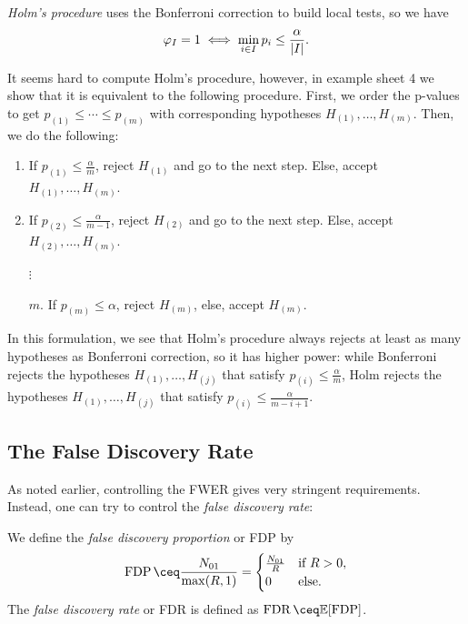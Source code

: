 \begin{example}
	\emph{Holm's procedure} uses the Bonferroni correction to build local tests, so we have
	\[
	\varphi_I = 1 \iff \min_{i \in I} p_i \leq \frac\alpha{\abs{I}}. 
	\]
\end{example}
It seems hard to compute Holm's procedure, however, in example sheet 4 we show that it is equivalent to the following procedure. First, we order the p-values to get $p_{(1)} \leq \dotsb \leq p_{(m)}$ with corresponding hypotheses $H_{(1)}, \dotsc, H_{(m)}$. Then, we do the following:
\begin{enumerate}
	\item If $p_{(1)} \leq \frac\alpha m$, reject $H_{(1)}$ and go to the next step. Else, accept $H_{(1)}, \dotsc, H_{(m)}$. 
	\item If $p_{(2)} \leq \frac\alpha{m-1}$, reject $H_{(2)}$ and go to the next step. Else, accept $H_{(2)}, \dotsc, H_{(m)}$. 
	\item[$\vdots$]
	\item[$m$.] If $p_{(m)} \leq \alpha$, reject $H_{(m)}$, else, accept $H_{(m)}$.  
\end{enumerate}
In this formulation, we see that Holm's procedure always rejects at least as many hypotheses as Bonferroni correction, so it has higher power: while Bonferroni rejects the hypotheses $H_{(1)}, \dotsc, H_{(j)}$ that satisfy $p_{(i)} \leq \frac\alpha m$, Holm rejects the hypotheses $H_{(1)}, \dotsc, H_{(j)}$ that satisfy $p_{(i)} \leq \frac{\alpha}{m - i + 1}$.

\subsection{The False Discovery Rate}
As noted earlier, controlling the FWER gives very stringent requirements. Instead, one can try to control the \emph{false discovery rate}:
\begin{definition}
	We define the \emph{false discovery proportion} or FDP by 
	\[
	\FDP \ceq \frac{N_{01}}{\max(R, 1)} = \begin{cases}
		\frac{N_{01}}{R} &\text{if $R > 0$}, \\ 0 &\text{else}. 
	\end{cases}
	\]
	The \emph{false discovery rate} or FDR is defined as $\FDR\ceq \EE[\FDP]$. 
\end{definition}

